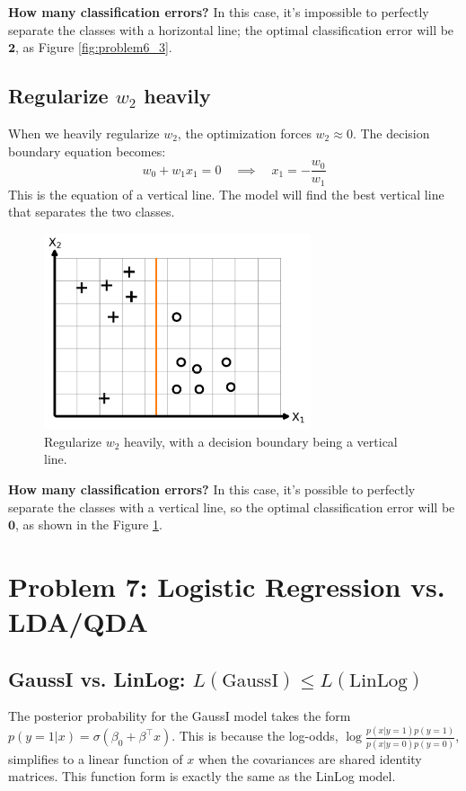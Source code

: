 \documentclass[11pt, a4paper, oneside]{memoir}
\begin{document}
\textbf{How many classification errors?} In this case, it's impossible to perfectly separate the classes with a horizontal line;
the optimal classification error will be $\textbf{2}$, as Figure \ref{fig:problem6_3}.

\section[Regularize w2 heavily]{Regularize $w_2$ heavily}
When we heavily regularize $w_2$, the optimization forces $w_2 \approx 0$. The decision boundary equation becomes:
\[ w_0 + w_1x_1 = 0 \quad \implies \quad x_1 = -\frac{w_0}{w_1} \]
This is the equation of a vertical line. The model will find the best vertical line that separates the two classes.

\begin{figure}[H]
    \centering
    \includegraphics[width=0.7\textwidth]{code/result/problem6_4.pdf}
    \caption{Regularize $w_2$ heavily, with a decision boundary being a vertical line.}
    \label{fig:problem6_4}
\end{figure}

\textbf{How many classification errors?} In this case, it's possible to perfectly separate the classes with a vertical line,
so the optimal classification error will be $\textbf{0}$, as shown in the Figure \ref{fig:problem6_4}.

\chapter{Problem 7: Logistic Regression vs. LDA/QDA}
\section[GaussI vs. LinLog]{GaussI vs. LinLog: $L(\text{GaussI}) \le L(\text{LinLog})$}
The posterior probability for the GaussI model takes the form $p(y=1|x) = \sigma(\beta_0 + \beta^\top x)$.
This is because the log-odds, $\log \frac{p(x|y=1)p(y=1)}{p(x|y=0)p(y=0)}$, simplifies to a linear function of $x$
when the covariances are shared identity matrices. This function form is exactly the same as the LinLog model.
\end{document}
